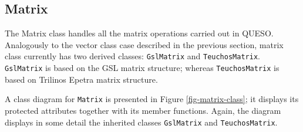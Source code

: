 \subsection{Matrix}\label{sec:matrix_class}



The Matrix class handles all the matrix operations carried out in QUESO.  Analogously to the vector class case described in the previous section,
matrix class currently has two derived classes: \verb+GslMatrix+ and \verb+TeuchosMatrix+. \verb+GslMatrix+ is based on the GSL matrix structure; whereas \verb+TeuchosMatrix+ is based on Trilinos Epetra matrix structure.

A class diagram for \verb+Matrix+  is presented in Figure \ref{fig-matrix-class}; it displays its protected attributes together with its member functions. Again, the diagram displays in some detail the inherited classes \verb+GslMatrix+ and \verb+TeuchosMatrix+.


